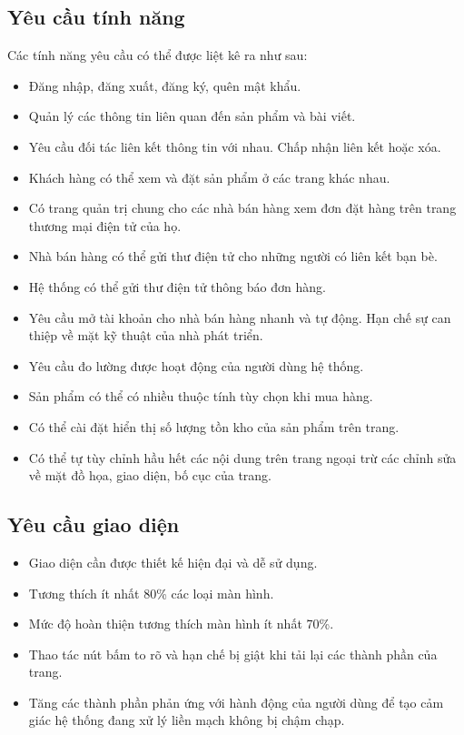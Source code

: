 \documentclass[11pt]{report}
\begin{document}
	\subsection{Yêu cầu tính năng}
	Các tính năng yêu cầu có thể được liệt kê ra như sau:
	\begin{itemize}
		\item Đăng nhập, đăng xuất, đăng ký, quên mật khẩu.
		\item Quản lý các thông tin liên quan đến sản phẩm và bài viết.
		\item Yêu cầu đối tác liên kết thông tin với nhau. Chấp nhận liên kết hoặc xóa.
		\item Khách hàng có thể xem và đặt sản phẩm ở các trang khác nhau.
		\item Có trang quản trị chung cho các nhà bán hàng xem đơn đặt hàng trên trang thương mại điện tử của họ.
		\item Nhà bán hàng có thể gửi thư điện tử cho những người có liên kết bạn bè.
		\item Hệ thống có thể gửi thư điện tử thông báo đơn hàng.
		\item Yêu cầu mở tài khoản cho nhà bán hàng nhanh và tự động. Hạn chế sự can thiệp về mặt kỹ thuật của nhà phát triển.
		\item Yêu cầu đo lường được hoạt động của người dùng hệ thống.
		\item Sản phẩm có thể có nhiều thuộc tính tùy chọn khi mua hàng.
		\item Có thể cài đặt hiển thị số lượng tồn kho của sản phẩm trên trang.
		\item Có thể tự tùy chỉnh hầu hết các nội dung trên trang ngoại trừ các chỉnh sửa về mặt đồ họa, giao diện, bố cục của trang.
	\end{itemize}
	\subsection{Yêu cầu giao diện}
	\begin{itemize}
		\item Giao diện cần được thiết kế hiện đại và dễ sử dụng.
		\item Tương thích ít nhất 80\% các loại màn hình.
		\item Mức độ hoàn thiện tương thích màn hình ít nhất 70\%.
		\item Thao tác nút bấm to rõ và hạn chế bị giật khi tải lại các thành phần của trang.
		\item Tăng các thành phần phản ứng với hành động của người dùng để tạo cảm giác hệ thống đang xử lý liền mạch không bị chậm chạp.
	\end{itemize}
\end{document}
